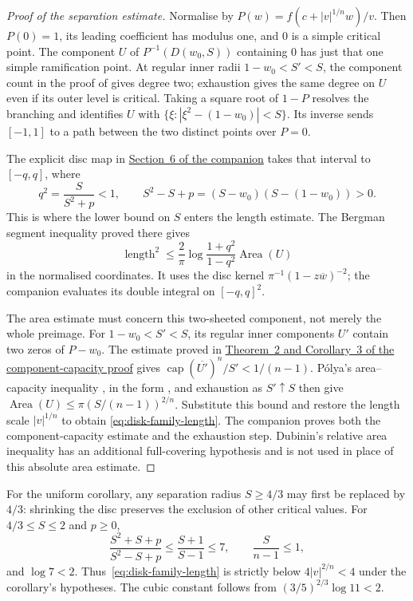 \documentclass[11pt]{article}
\begin{document}
\begin{proof}[Proof of the separation estimate]
Normalise by $P(w)=f(c+|v|^{1/n}w)/v$. Then $P(0)=1$, its leading
coefficient has modulus one, and $0$ is a simple critical point. The
component $U$ of $P^{-1}(D(w_0,S))$ containing $0$ has just that one
simple ramification point. At regular inner radii $1-w_0<S'<S$, the
component count in the proof of \cite[Proposition~2.1]{eks2010} gives
degree two; exhaustion gives the same degree on $U$ even if its outer
level is critical. Taking a square root of $1-P$ resolves the branching
and identifies $U$ with
$\{\xi:|\xi^2-(1-w_0)|<S\}$. Its inverse sends $[-1,1]$ to a path
between the two distinct points over $P=0$.

The explicit disc map in \href{erdos1041-lemniscate-reasoning-surface.pdf\#section.6}{Section~6 of the companion} takes that interval
to $[-q,q]$, where
\[
 q^2=\frac{S}{S^2+p}<1,
 \qquad S^2-S+p=(S-w_0)(S-(1-w_0))>0.
\]
This is where the lower bound on $S$ enters the length estimate. The
Bergman segment inequality proved there gives
\[
 \operatorname{length}^2
 \le\frac2\pi\log\frac{1+q^2}{1-q^2}\operatorname{Area}(U)
\]
in the normalised coordinates. It uses the disc kernel
$\pi^{-1}(1-z\overline w)^{-2}$; the companion evaluates its double
integral on $[-q,q]^2$.

The area estimate must concern this two-sheeted component, not merely
the whole preimage. For $1-w_0<S'<S$, its regular inner components
$U'$ contain two zeros of $P-w_0$. The estimate proved in
\href{https://github.com/wcook04/plectis-erdos/blob/8efbccc235df64a38d83f5dc7b1949e2ad18270d/research_corpus/Erdos1041/problem/ExteriorBlaschkeFibreCapacityGap.md}{Theorem~2 and Corollary~3 of the component-capacity proof}
gives $\operatorname{cap}(\overline{U'})^n/S'<1/(n-1)$.
P\'olya's area--capacity inequality \cite[printed pp.~280--282]{polya1928},
in the form \cite[Theorem~6]{crane}, and exhaustion as $S'\uparrow S$
then give $\operatorname{Area}(U)\le\pi(S/(n-1))^{2/n}$.
Substitute this bound and restore the length scale $|v|^{1/n}$ to obtain
\eqref{eq:disk-family-length}. The companion proves both the
component-capacity estimate and the exhaustion step. Dubinin's relative
area inequality \cite[Theorem~1]{dubinin} has an additional full-covering
hypothesis and is not used in place of this absolute area estimate.
\end{proof}

For the uniform corollary, any separation radius $S\ge4/3$ may first
be replaced by $4/3$: shrinking the disc preserves the exclusion of
other critical values. For $4/3\le S\le2$ and $p\ge0$,
\[
 \frac{S^2+S+p}{S^2-S+p}\le\frac{S+1}{S-1}\le7,
 \qquad \frac{S}{n-1}\le1,
\]
and $\log7<2$.  Thus~\eqref{eq:disk-family-length} is strictly below
$4|v|^{2/n}<4$ under the corollary's hypotheses.  The cubic constant follows
from $(3/5)^{2/3}\log11<2$.
\end{document}
